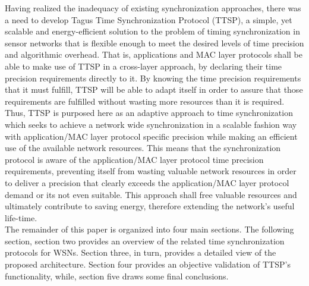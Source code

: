 Having realized the inadequacy of existing synchronization approaches, there was a need to develop Tagus Time Synchronization Protocol (TTSP), a simple, yet scalable and energy-efficient solution to the problem of timing synchronization in sensor networks that is flexible enough to meet the desired levels of time precision and algorithmic overhead. That is, applications and MAC layer protocols shall be able to make use of TTSP in a cross-layer approach, by declaring their time precision requirements directly to it. By knowing the time precision requirements that it must fulfill, TTSP will be able to adapt itself in order to assure that those requirements are fulfilled without wasting more resources than it is required.
Thus, TTSP is purposed here as an adaptive approach to time synchronization which seeks to achieve a network wide synchronization in a scalable fashion way with application/MAC layer protocol specific precision while making an efficient use of the available network resources. This means that the synchronization protocol is aware of the application/MAC layer protocol time precision requirements, preventing itself from wasting valuable network resources in order to deliver a precision that clearly exceeds the application/MAC layer protocol demand or its not even suitable. This approach shall free valuable resources and ultimately contribute to saving energy, therefore extending the network's useful life-time.\\

The remainder of this paper is organized into four main sections. The following section, section two provides an overview of the related time synchronization protocols for WSNs. Section three, in turn, provides a detailed view of the proposed architecture. Section four provides an objective validation of TTSP's functionality, while, section five draws some final conclusions.\\
